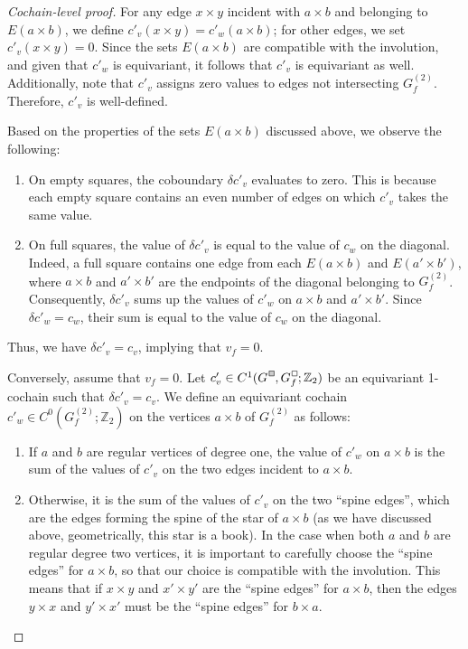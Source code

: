 \documentclass[a4paper,12pt,reqno,oneside]{amsart}
\theoremstyle{plain}
\theoremstyle{definition}
\theoremstyle{plain}
\newcommand{\Z}{\mathbb{Z}}
\newcommand{\gbox}{\tikz{\node[shape=rectangle,fill=black!20,draw,inner sep=0.7mm,align=center] (char) {};}}
\newcommand{\wbox}{\tikz{\node[shape=rectangle,draw,inner sep=0.7mm,align=center] (char) {};}}
\newcommand*\Gc{G^{\hspace{1pt}\raisebox{0.8pt}{\gbox}}}
\newcommand*\Gcf{G^{\hspace{1pt}\raisebox{0.8pt}{\wbox}}_{f}}
\begin{document}
\begin{proof}[Cochain-level proof]
  For any edge $x \times y$ incident with $a \times b$ and belonging to $E(a \times b)$, we define
  $c'_v(x \times y) = c'_w(a \times b)$; for other edges, we set $c'_v(x \times y) = 0$. Since the
  sets $E(a \times b)$ are compatible with the involution, and given that $c'_w$ is equivariant, it
  follows that $c'_v$ is equivariant as well. Additionally, note that $c'_v$ assigns zero values to
  edges not intersecting $G^{(2)}_f$. Therefore, $c'_v$ is well-defined.

  Based on the properties of the sets $E(a \times b)$ discussed above, we observe the following:
  \begin{enumerate}
  \item On empty squares, the coboundary $\delta c'_v$ evaluates to zero. This is because each empty
    square contains an even number of edges on which $c'_v$ takes the same value.
  \item On full squares, the value of $\delta c'_v$ is equal to the value of $c_w$ on the
    diagonal. Indeed, a full square contains one edge from each $E(a \times b)$ and
    $E(a' \times b')$, where $a \times b$ and $a' \times b'$ are the endpoints of the diagonal
    belonging to $G^{(2)}_f$. Consequently, $\delta c'_v$ sums up the values of $c'_w$ on
    $a \times b$ and $a' \times b'$. Since $\delta c'_w = c_w$, their sum is equal to the value of
    $c_w$ on the diagonal.
  \end{enumerate}

  Thus, we have $\delta c'_v = c_v$, implying that $v_f = 0$.

  Conversely, assume that $v_f = 0$. Let $c'_v \in C^1(\Gc, \Gcf; \Z_2)$ be an
  equivariant 1-cochain such that $\delta c'_v = c_v$. We define an equivariant cochain
  $c'_w \in C^0(G^{(2)}_f; \Z_2)$ on the vertices $a \times b$ of $G^{(2)}_f$ as follows:
  \begin{enumerate}
  \item If $a$ and $b$ are regular vertices of degree one, the value of $c'_w$ on $a \times b$ is the
    sum of the values of $c'_v$ on the two edges incident to $a \times b$.
  \item Otherwise, it is the sum of the values of $c'_v$ on the two ``spine edges'', which are the edges
    forming the spine of the star of $a \times b$ (as we have discussed above, geometrically, this
    star is a book). In the case when both $a$ and $b$ are regular degree two vertices, it is
    important to carefully choose the ``spine edges'' for $a \times b$, so that our choice is
    compatible with the involution. This means that if $x \times y$ and $x' \times y'$ are the ``spine
    edges'' for $a \times b$, then the edges $y \times x$ and $y' \times x'$ must be the ``spine edges''
    for $b \times a$.
  \end{enumerate}


\end{proof}
\end{document}
